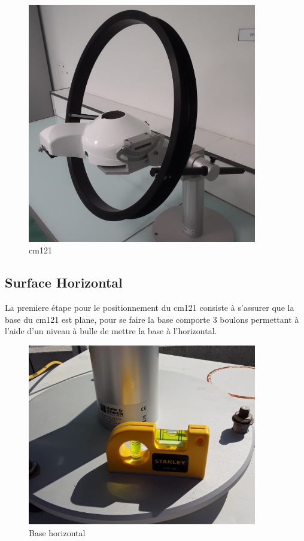 \documentclass[12pt,a4paper]{article}
\begin{document}
\begin{flushleft}
\begin{figure}[H]
\centering
\includegraphics[width=10cm]{image/montage/1.jpg} 
\caption{cm121}
\end{figure}

\subsection{Surface Horizontal}

La premiere étape pour le positionnement du cm121 consiste à s'assurer que la base du cm121 est plane, pour se faire la base comporte 3 boulons permettant à l'aide d'un niveau à bulle de mettre la base à l'horizontal. 

\begin{figure}[H]
\centering
\includegraphics[width=10cm]{image/montage/2.jpg} 
\caption{Base horizontal}
\end{figure}


\end{flushleft}
\end{document}
